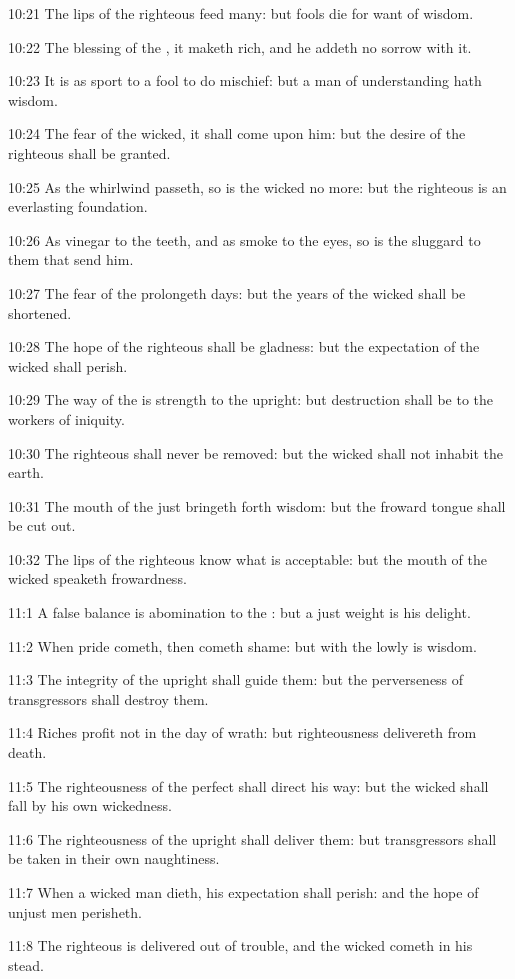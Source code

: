 10:21 The lips of the righteous feed many: but fools die for want of wisdom.

10:22 The blessing of the \LORD, it maketh rich, and he addeth no sorrow with it.

10:23 It is as sport to a fool to do mischief: but a man of understanding hath wisdom.

10:24 The fear of the wicked, it shall come upon him: but the desire of the righteous shall be granted.

10:25 As the whirlwind passeth, so is the wicked no more: but the righteous is an everlasting foundation.

10:26 As vinegar to the teeth, and as smoke to the eyes, so is the sluggard to them that send him.

10:27 The fear of the \LORD prolongeth days: but the years of the wicked shall be shortened.

10:28 The hope of the righteous shall be gladness: but the expectation of the wicked shall perish.

10:29 The way of the \LORD is strength to the upright: but destruction shall be to the workers of iniquity.

10:30 The righteous shall never be removed: but the wicked shall not inhabit the earth.

10:31 The mouth of the just bringeth forth wisdom: but the froward tongue shall be cut out.

10:32 The lips of the righteous know what is acceptable: but the mouth of the wicked speaketh frowardness.

11:1 A false balance is abomination to the \LORD: but a just weight is his delight.

11:2 When pride cometh, then cometh shame: but with the lowly is wisdom.

11:3 The integrity of the upright shall guide them: but the perverseness of transgressors shall destroy them.

11:4 Riches profit not in the day of wrath: but righteousness delivereth from death.

11:5 The righteousness of the perfect shall direct his way: but the wicked shall fall by his own wickedness.

11:6 The righteousness of the upright shall deliver them: but transgressors shall be taken in their own naughtiness.

11:7 When a wicked man dieth, his expectation shall perish: and the hope of unjust men perisheth.

11:8 The righteous is delivered out of trouble, and the wicked cometh in his stead.

